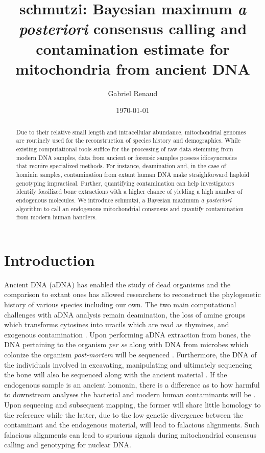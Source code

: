 \documentclass[a4paper,12pt]{article}
\begin{document}
\title{schmutzi: Bayesian maximum {\it a posteriori} consensus calling and contamination estimate for mitochondria from ancient DNA }
\date{\today}
\author{Gabriel Renaud}

\maketitle

\tableofcontents
\begin{abstract}
Due to their relative small length and intracellular abundance, mitochondrial genomes are routinely used for the reconstruction of species history and demographics. While existing computational tools suffice for the processing of raw data stemming from modern DNA samples, data from ancient or forensic samples possess idiosyncrasies that require specialized methods. For instance, deamination and, in the case of hominin samples, contamination from extant human DNA make straighforward haploid genotyping impractical. Further, quantifying contamination can help investigators identify fossilized bone extractions with a higher chance of yielding a high number of endogenous molecules. We introduce schmutzi, a Bayesian maximum {\it a posteriori} algorithm to call an endogenous mitochondrial consensus and quantify contamination from modern human handlers. 
\end{abstract}

\section{Introduction}

Ancient DNA (aDNA) has enabled the study of dead organisms and the comparison to extant ones has allowed researchers to reconstruct the phylogenetic history of various species including our own. The two main computational challenges with aDNA analysis remain deamination, the loss of amine groups which transforms cytosines into uracils which are read as thymines, and exogenous contamination \cite{briggs2007patterns}. Upon performing aDNA extraction from bones, the DNA pertaining to the organism {\it per se} along with DNA from microbes which colonize the organism {\it post-mortem} will be sequenced \cite{sidow1991bacterial,handt1994ancient}. Furthermore, the DNA of the individuals involved in excavating, manipulating and ultimately sequencing the bone will also be sequenced along with the ancient material \cite{bandelt2005mosaics}. If the endogenous sample is an ancient homonin, there is a difference as to how harmful to downstream analyses the bacterial and modern human contaminants will be . Upon sequecing and subsequent mapping, the former will share little homology to the reference while the latter, due to the low genetic divergence between the contaminant and the endogenous material, will lead to falacious alignments. Such falacious alignments can lead to spurious signals during mitochondrial consensus calling and genotyping for nuclear DNA. 
\end{document}
